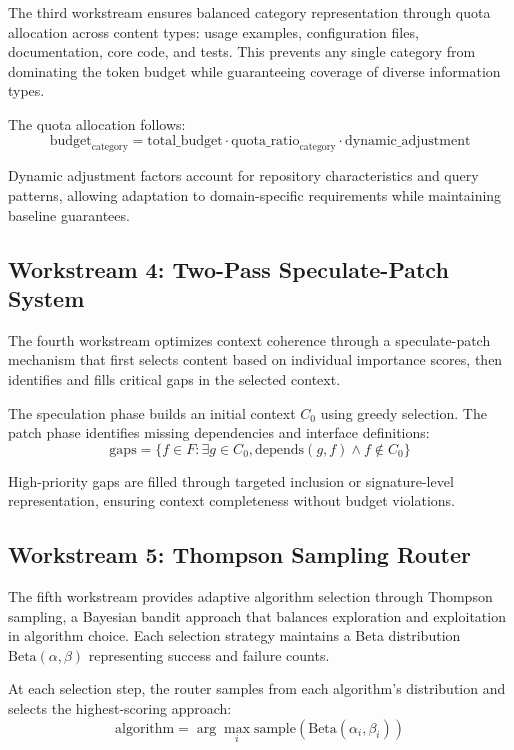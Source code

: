 \documentclass[conference]{IEEEtran}
\begin{document}
The third workstream ensures balanced category representation through quota allocation across content types: usage examples, configuration files, documentation, core code, and tests. This prevents any single category from dominating the token budget while guaranteeing coverage of diverse information types.

The quota allocation follows:
\begin{equation}
\text{budget}_{\text{category}} = \text{total\_budget} \cdot \text{quota\_ratio}_{\text{category}} \cdot \text{dynamic\_adjustment}
\end{equation}

Dynamic adjustment factors account for repository characteristics and query patterns, allowing adaptation to domain-specific requirements while maintaining baseline guarantees.

\subsection{Workstream 4: Two-Pass Speculate-Patch System}

The fourth workstream optimizes context coherence through a speculate-patch mechanism that first selects content based on individual importance scores, then identifies and fills critical gaps in the selected context.

The speculation phase builds an initial context $C_0$ using greedy selection. The patch phase identifies missing dependencies and interface definitions:
\begin{equation}
\text{gaps} = \{f \in F : \exists g \in C_0, \text{depends}(g, f) \land f \notin C_0\}
\end{equation}

High-priority gaps are filled through targeted inclusion or signature-level representation, ensuring context completeness without budget violations.

\subsection{Workstream 5: Thompson Sampling Router}

The fifth workstream provides adaptive algorithm selection through Thompson sampling, a Bayesian bandit approach that balances exploration and exploitation in algorithm choice. Each selection strategy maintains a Beta distribution $\text{Beta}(\alpha, \beta)$ representing success and failure counts.

At each selection step, the router samples from each algorithm's distribution and selects the highest-scoring approach:
\begin{equation}
\text{algorithm} = \arg\max_{i} \text{sample}(\text{Beta}(\alpha_i, \beta_i))
\end{equation}
\end{document}
